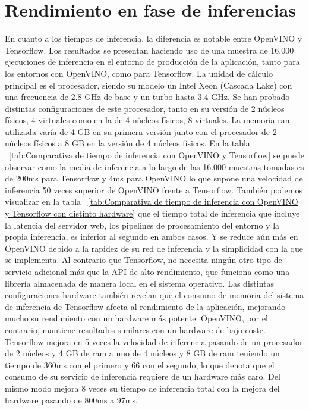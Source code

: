 \section{Rendimiento en fase de inferencias}\label{sec:ren-dimiento-en-fase-de-inferencias}
En cuanto a los tiempos de inferencia, la diferencia es notable entre OpenVINO y Tensorflow.
Los resultados se presentan haciendo uso de una muestra de 16.000 ejecuciones de inferencia en el entorno de producción de la aplicación, tanto para los entornos con OpenVINO, como para Tensorflow.
La unidad de cálculo principal es el procesador, siendo su modelo un Intel Xeon (Cascada Lake) con una frecuencia de 2.8 GHz de base y un turbo hasta 3.4 GHz.
Se han probado distintas configuraciones de este procesador, tanto en su versión de 2 núcleos físicos, 4 virtuales como en la de 4 núcleos físicos, 8 virtuales.
La memoria ram utilizada varía de 4 GB en su primera versión junto con el procesador de 2 núcleos físicos a 8 GB en la versión de 4 núcleos físicos.
En la tabla ~\ref{tab:Comparativa de tiempo de inferencia con OpenVINO y Tensorflow} se puede observar como la media de inferencia a lo largo de las 16.000 muestras tomadas
es de 200ms para Tensorflow y 4ms para OpenVINO lo que supone una velocidad de inferencia 50 veces superior de OpenVINO frente a Tensorflow.
También podemos visualizar en la tabla ~\ref{tab:Comparativa de tiempo de inferencia con OpenVINO y Tensorflow con distinto hardware} que el tiempo total de inferencia que incluye la latencia del servidor web, los pipelines de procesamiento del entorno y la propia inferencia, es inferior al segundo en ambos casos.
Y se reduce aún más en OpenVINO debido a la rapidez de su red de inferencia y la simplicidad con la que se implementa.
Al contrario que Tensorflow, no necesita ningún otro tipo de servicio adicional más que la API de alto rendimiento, que funciona como una librería almacenada de manera local en el sistema operativo.
Las distintas configuraciones hardware también revelan que el consumo de memoria del sistema de inferencia de Tensorflow afecta al rendimiento de la aplicación, mejorando mucho su rendimiento con un hardware más potente.
OpenVINO, por el contrario, mantiene resultados similares con un hardware de bajo coste.
Tensorflow mejora en 5 veces la velocidad de inferencia pasando de un procesador de 2 núcleos y 4 GB de ram a uno de 4 núcleos y 8 GB de ram teniendo un tiempo de 360ms con el primero y 66 con el segundo, lo que denota que el consumo de su servicio de inferencia requiere de un hardware más caro.
Del mismo modo mejora 8 veces su tiempo de inferencia total con la mejora del hardware pasando de 800ms a 97ms.


